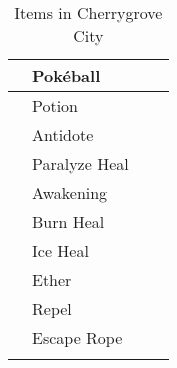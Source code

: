 \begin{longtable}{|| l l l l ||}%
\hline%
&Pokéball&&\\%
\hline%
&Potion&&\\%
\hline%
&Antidote&&\\%
\hline%
&Paralyze Heal&&\\%
\hline%
&Awakening&&\\%
\hline%
&Burn Heal&&\\%
\hline%
&Ice Heal&&\\%
\hline%
&Ether&&\\%
\hline%
&Repel&&\\%
\hline%
&Escape Rope&&\\%
\hline%
\endhead%
\hline%
\caption{Items in Cherrygrove City}%
\label{tab:CherrygroveCityItems}%
\end{longtable}